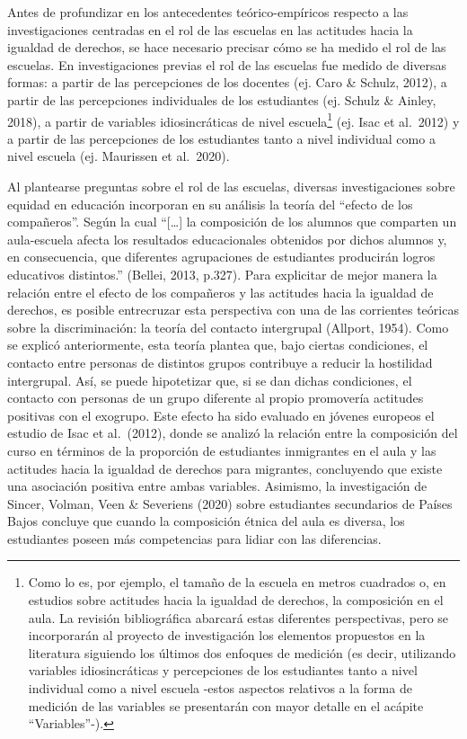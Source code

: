 \documentclass[12pt,twoside]{templates/facsothesis}
\begin{document}
Antes de profundizar en los antecedentes teórico-empíricos respecto a las investigaciones centradas en el rol de las escuelas en las actitudes hacia la igualdad de derechos, se hace necesario precisar cómo se ha medido el rol de las escuelas. En investigaciones previas el rol de las escuelas fue medido de diversas formas: a partir de las percepciones de los docentes (ej. Caro \& Schulz, 2012), a partir de las percepciones individuales de los estudiantes (ej. Schulz \& Ainley, 2018), a partir de variables idiosincráticas de nivel escuela\footnote{Como lo es, por ejemplo, el tamaño de la escuela en metros cuadrados o, en estudios sobre actitudes hacia la igualdad de derechos, la composición en el aula. La revisión bibliográfica abarcará estas diferentes perspectivas, pero se incorporarán al proyecto de investigación los elementos propuestos en la literatura siguiendo los últimos dos enfoques de medición (es decir, utilizando variables idiosincráticas y percepciones de los estudiantes tanto a nivel individual como a nivel escuela -estos aspectos relativos a la forma de medición de las variables se presentarán con mayor detalle en el acápite ``Variables''-).} (ej. Isac et al.~2012) y a partir de las percepciones de los estudiantes tanto a nivel individual como a nivel escuela (ej. Maurissen et al.~2020).

Al plantearse preguntas sobre el rol de las escuelas, diversas investigaciones sobre equidad en educación incorporan en su análisis la teoría del ``efecto de los compañeros''. Según la cual ``{[}\ldots{]} la composición de los alumnos que comparten un aula-escuela afecta los resultados educacionales obtenidos por dichos alumnos y, en consecuencia, que diferentes agrupaciones de estudiantes producirán logros educativos distintos.'' (Bellei, 2013, p.327). Para explicitar de mejor manera la relación entre el efecto de los compañeros y las actitudes hacia la igualdad de derechos, es posible entrecruzar esta perspectiva con una de las corrientes teóricas sobre la discriminación: la teoría del contacto intergrupal (Allport, 1954). Como se explicó anteriormente, esta teoría plantea que, bajo ciertas condiciones, el contacto entre personas de distintos grupos contribuye a reducir la hostilidad intergrupal. Así, se puede hipotetizar que, si se dan dichas condiciones, el contacto con personas de un grupo diferente al propio promovería actitudes positivas con el exogrupo. Este efecto ha sido evaluado en jóvenes europeos el estudio de Isac et al.~(2012), donde se analizó la relación entre la composición del curso en términos de la proporción de estudiantes inmigrantes en el aula y las actitudes hacia la igualdad de derechos para migrantes, concluyendo que existe una asociación positiva entre ambas variables. Asimismo, la investigación de Sincer, Volman, Veen \& Severiens (2020) sobre estudiantes secundarios de Países Bajos concluye que cuando la composición étnica del aula es diversa, los estudiantes poseen más competencias para lidiar con las diferencias.
\end{document}
